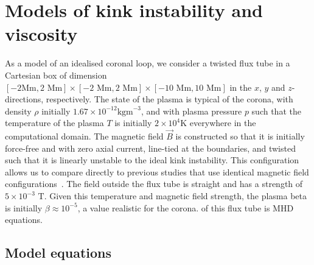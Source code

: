 \section{Models of kink instability and viscosity}
\label{sec:model-setup}

As a model of an idealised coronal loop, we consider a
twisted flux tube in a Cartesian box of dimension $[-2\text{
    Mm},2\text{ Mm}] \times [-2\text{ Mm},2\text{ Mm}] \times
   [-10\text{ Mm},10\text{ Mm}]$ in the $x$, $y$ and $z$-directions,
   respectively. The state of the plasma is typical of the corona,
   with density $\rho$ initially $1.67\times 10^{-12} \text{
     kgm}^{-3}$, and with plasma pressure $p$ such that the
   temperature of the plasma $T$ is initially $2\times10^{4} \text{
     K}$ everywhere in the computational domain. The magnetic
   field $\vec{B}$ is constructed so that it is initially force-free
   and with zero axial current, line-tied at the boundaries, and
   twisted such that it is linearly unstable to the ideal kink
   instability. This configuration allows us to compare directly to
   previous studies that use identical magnetic field
   configurations~\cite{hoodCoronalHeatingMagnetic2009,barefordShockHeatingNumerical2015,bothaOBSERVATIONALSIGNATURESCORONAL2012}. The
   field outside the flux tube is straight and has a strength of
   $5\times10^{-3} \text{ T}$. Given this temperature and magnetic
   field strength, the plasma beta is initially $\beta \approx
   10^{-5}$, a value realistic for the corona.  of
   this flux tube is  MHD equations.

\subsection{Model equations}

